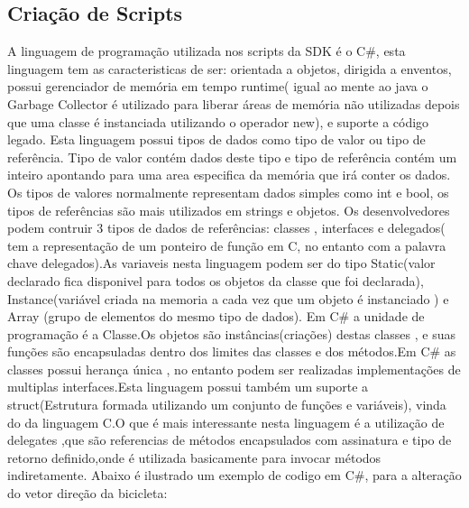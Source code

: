 \subsection{Criação de Scripts}
\label{sub:criacao_de_scripts}
       A linguagem de programação utilizada nos scripts da SDK é o C\#, esta linguagem tem as caracteristicas de ser: orientada a objetos, dirigida a enventos, possui gerenciador de memória em tempo runtime( igual ao mente ao java o Garbage Collector é utilizado para liberar áreas de memória não utilizadas depois que uma classe é instanciada utilizando o operador new), e suporte a código legado.
       Esta linguagem possui tipos de dados como tipo de valor ou tipo de referência. Tipo de valor contém dados deste tipo e tipo de referência contém um inteiro apontando para uma area especifica da memória que irá conter os dados. Os tipos de valores normalmente representam dados simples como int e bool,  os tipos de referências são mais utilizados em strings e objetos. Os desenvolvedores podem contruir 3 tipos de dados de referências: classes , interfaces e delegados( tem a representação de um ponteiro de função em C, no entanto com a palavra chave delegados).As variaveis nesta linguagem podem ser do tipo Static(valor declarado fica disponivel para todos os objetos da classe que foi declarada), Instance(variável criada na memoria a cada vez que um  objeto é instanciado ) e Array (grupo de elementos do mesmo tipo de dados).
      Em C\# a unidade de programação é a Classe.Os objetos são instâncias(criações) destas classes , e suas funções são encapsuladas dentro dos limites  das classes e dos métodos.Em C\# as classes possui herança única , no entanto podem ser realizadas implementações de multiplas interfaces.Esta linguagem possui também um suporte a struct(Estrutura formada utilizando um conjunto de funções e variáveis), vinda do da linguagem C.O que é mais interessante nesta linguagem é a utilização de delegates ,que são referencias de métodos encapsulados com assinatura e tipo de retorno definido,onde é utilizada basicamente para invocar métodos indiretamente.
      Abaixo é ilustrado um exemplo de codigo em C\#, para a alteração do vetor direção da bicicleta:
 
